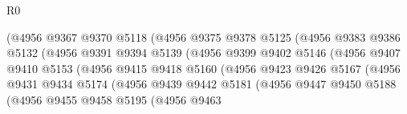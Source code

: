 \begin{lexlean}{R0}
\begin{coremodule}
                                  (@4956
                                    @9367
                                    @9370
                                    @5118
                                    (@4956
                                      @9375
                                      @9378
                                      @5125
                                      (@4956
                                        @9383
                                        @9386
                                        @5132
                                        (@4956
                                          @9391
                                          @9394
                                          @5139
                                          (@4956
                                            @9399
                                            @9402
                                            @5146
                                            (@4956
                                              @9407
                                              @9410
                                              @5153
                                              (@4956
                                                @9415
                                                @9418
                                                @5160
                                                (@4956
                                                  @9423
                                                  @9426
                                                  @5167
                                                  (@4956
                                                    @9431
                                                    @9434
                                                    @5174
                                                    (@4956
                                                      @9439
                                                      @9442
                                                      @5181
                                                      (@4956
                                                        @9447
                                                        @9450
                                                        @5188
                                                        (@4956
                                                          @9455
                                                          @9458
                                                          @5195
                                                          (@4956
                                                            @9463

\end{coremodule}
\end{lexlean}
